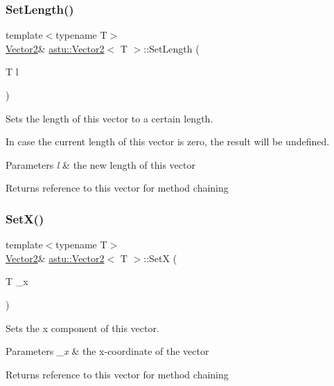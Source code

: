 \subsubsection{\texorpdfstring{Set\+Length()}{SetLength()}}
{\footnotesize\ttfamily template$<$typename T$>$ \\
\hyperlink{classastu_1_1Vector2}{Vector2}\& \hyperlink{classastu_1_1Vector2}{astu\+::\+Vector2}$<$ T $>$\+::Set\+Length (\begin{DoxyParamCaption}\item[{T}]{l }\end{DoxyParamCaption})\hspace{0.3cm}{\ttfamily [inline]}}

Sets the length of this vector to a certain length.

In case the current length of this vector is zero, the result will be undefined.


\begin{DoxyParams}{Parameters}
{\em l} & the new length of this vector \\
\hline
\end{DoxyParams}
\begin{DoxyReturn}{Returns}
reference to this vector for method chaining 
\end{DoxyReturn}
\mbox{\label{classastu_1_1Vector2_ad3bb5d95529930813f270b6425741364}} 
\subsubsection{\texorpdfstring{Set\+X()}{SetX()}}
{\footnotesize\ttfamily template$<$typename T$>$ \\
\hyperlink{classastu_1_1Vector2}{Vector2}\& \hyperlink{classastu_1_1Vector2}{astu\+::\+Vector2}$<$ T $>$\+::SetX (\begin{DoxyParamCaption}\item[{T}]{\+\_\+x }\end{DoxyParamCaption})\hspace{0.3cm}{\ttfamily [inline]}}

Sets the x component of this vector.


\begin{DoxyParams}{Parameters}
{\em \+\_\+x} & the x-\/coordinate of the vector \\
\hline
\end{DoxyParams}
\begin{DoxyReturn}{Returns}
reference to this vector for method chaining 
\end{DoxyReturn}
\mbox{\label{classastu_1_1Vector2_a3241be81f52b56f822bb71def51f4075}} 
